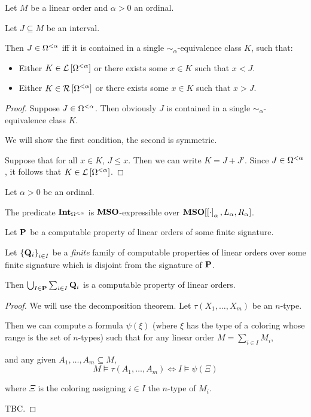 \begin{lemma}\label{alpha-expressible}
  Let $M$ be a linear order and $\alpha > 0$ an ordinal.

  Let $J \subseteq M$ be an interval.

  Then $J \in \Omega^{< \alpha}$ iff
  it is contained in a single $\sim_{\alpha}$-equivalence class $K$, such that:
  \begin{itemize}
    \item Either $K \in \mathcal{L} \left[ {{\Omega^{< \alpha}}} \right]$ or
          there exists some $x \in K$ such that $x < J$.
    \item Either $K \in \mathcal{R} \left[ {{\Omega^{< \alpha}}} \right]$ or
          there exists some $x \in K$ such that $x > J$.
  \end{itemize}
\end{lemma}

\begin{proof}
  Suppose $J \in \Omega^{< \alpha}$.
  Then obviously $J$ is contained in a single $\sim_{\alpha}$-equivalence class $K$.

  We will show the first condition, the second is symmetric.

  Suppose that for all $x \in K$, $J \le x$.
  Then we can write $K = J + J'$.
  Since $J \in \Omega^{< \alpha}$, it follows that $K \in \mathcal{L} \left[ {{\Omega^{< \alpha}}} \right]$.
\end{proof}

\begin{corollary}\label{int-expressible}
  Let $\alpha > 0$ be an ordinal.

  The predicate $\mathbf{Int}_{\Omega^{< \alpha}}$ is $\mathbf{MSO}$-expressible over
  $\mathbf{MSO}[\left[ {\cdot} \right]_{\alpha}, L_{\alpha}, R_{\alpha}]$.
\end{corollary}

\begin{theorem}\label{computable-sum}
  Let $\mathbf{P}$ be a computable property of linear orders of some finite signature.

  Let $\left\{ {\mathbf{Q}_i} \right\}_{i \in I}$ be a \emph{finite} family of computable properties of linear orders
  over some finite signature which is disjoint from the signature of $\mathbf{P}$.

  Then $\bigcup_{I \in \mathbf{P}} \sum_{i \in I} \mathbf{Q}_{i}$ is a computable property of linear orders.
\end{theorem}

\begin{proof}
  We will use the decomposition theorem.
  Let $\tau(X_1, \ldots, X_m)$ be an $n$-type.

  Then we can compute a formula $\psi(\xi)$ (where
  $\xi$ has the type of a coloring whose range is
  the set of $n$-types) such that
  for any linear order $M = \sum_{i \in I} M_i$,

  and any given $A_1, \ldots, A_m \subseteq M$,
  \[
    M \models \tau(A_1, \ldots, A_m)
    \iff I \models \psi(\Xi)
  \]

  where $\Xi$ is the coloring assigning $i \in I$ the $n$-type of $M_i$.

  TBC.
\end{proof}

